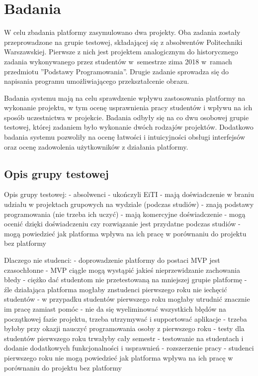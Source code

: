 \chapter{Badania}
\label{chapter:research}

W celu zbadania platformy zasymulowano dwa projekty.
Oba zadania zostały przeprowadzone na grupie testowej, składającej się z absolwentów Politechniki Warszawskiej.
Pierwsze z nich jest projektem analogicznym do historycznego zadania wykonywanego przez studentów w~semestrze zima 2018 w~ramach przedmiotu ”Podstawy Programowania”.
Drugie zadanie sprowadza się do napisania programu umożliwiającego przekształcenie obrazu.

Badania systemu mają na celu sprawdzenie wpływu zastosowania platformy na wykonanie projektu, w tym ocenę usprawnienia pracy studentów i wpływu na ich sposób uczestnictwa w projekcie.
Badania odbyły się na co dwu osobowej grupie testowej, której zadaniem było wykonanie dwóch rodzajów projektów.
Dodatkowo badania systemu pozwoliły na ocenę łatwości i intuicyjności obsługi interfejsów oraz ocenę zadowolenia użytkowników z działania platformy.


\section{Opis grupy testowej}

Opis grupy testowej:
- absolwenci
- ukończyli EiTI
- mają doświadczenie w braniu udziału w projektach grupowych na wydziale (podczas studiów)
- znają podstawy programowania (nie trzeba ich uczyć)
- mają komercyjne doświadczenie
- mogą ocenić dzięki doświadczeniu czy rozwiązanie jest przydatne podczas studiów
- mogą powiedzieć jak platforma wpływa na ich pracę w porównaniu do projektu bez platformy

Dlaczego nie studenci:
- doprowadzenie platformy do postaci MVP jest czasochłonne
- MVP ciągle mogą wystąpić jakieś nieprzewidzanie zachowania błedy
- ciężko dać studentom nie przetestowaną na mniejszej grupie platformę
- źle działająca platforma mogłaby znstudenci pierwszego roku nie iechęcić studentów
- w przypadku studentów pierwszego roku mogłaby utrudnić znacznie im pracę zamiast pomóc
- nie da się wyeliminować wszystkich błędów na początkowej fazie projektu, trzeba utrzymywać i supportować aplikacje
- trzeba byłoby przy okazji nauczyć programowania osoby z pierwszego roku
- testy dla studentów pierwszego roku trwałyby cały semestr
- testowanie na studentach i dodanie dodatkowych funkcjonalności i usprawnień - rozszerzenie pracy
- studenci pierwszego roku nie mogą powiedzieć jak platforma wpływa na ich pracę w porównaniu do projektu bez platformy


